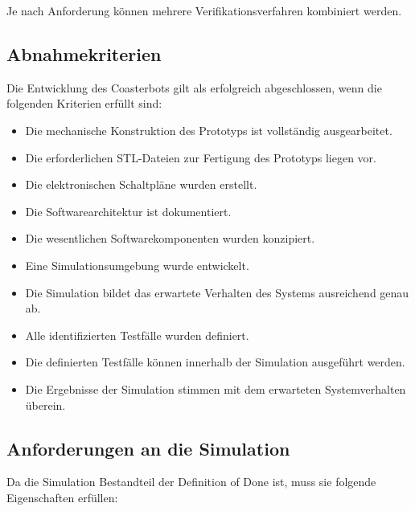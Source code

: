 \documentclass[
  a4paper,
  12pt,
  DIV=12,        %
  parskip=half,  %
  headings=small %
]{scrartcl}
\theoremstyle{definition}
\providecommand{\tightlist}{%
  \setlength{\itemsep}{0pt}\setlength{\parskip}{0pt}}
\theoremstyle{definition}
\begin{document}
Je nach Anforderung können mehrere Verifikationsverfahren kombiniert
werden.

\subsection{Abnahmekriterien}\label{abnahmekriterien}

Die Entwicklung des Coasterbots gilt als erfolgreich abgeschlossen, wenn
die folgenden Kriterien erfüllt sind:

\begin{itemize}
\tightlist
\item
  Die mechanische Konstruktion des Prototyps ist vollständig
  ausgearbeitet.
\item
  Die erforderlichen STL-Dateien zur Fertigung des Prototyps liegen vor.
\item
  Die elektronischen Schaltpläne wurden erstellt.
\item
  Die Softwarearchitektur ist dokumentiert.
\item
  Die wesentlichen Softwarekomponenten wurden konzipiert.
\item
  Eine Simulationsumgebung wurde entwickelt.
\item
  Die Simulation bildet das erwartete Verhalten des Systems ausreichend
  genau ab.
\item
  Alle identifizierten Testfälle wurden definiert.
\item
  Die definierten Testfälle können innerhalb der Simulation ausgeführt
  werden.
\item
  Die Ergebnisse der Simulation stimmen mit dem erwarteten
  Systemverhalten überein.
\end{itemize}

\subsection{Anforderungen an die
Simulation}\label{anforderungen-an-die-simulation}

Da die Simulation Bestandteil der Definition of Done ist, muss sie
folgende Eigenschaften erfüllen:
\end{document}
